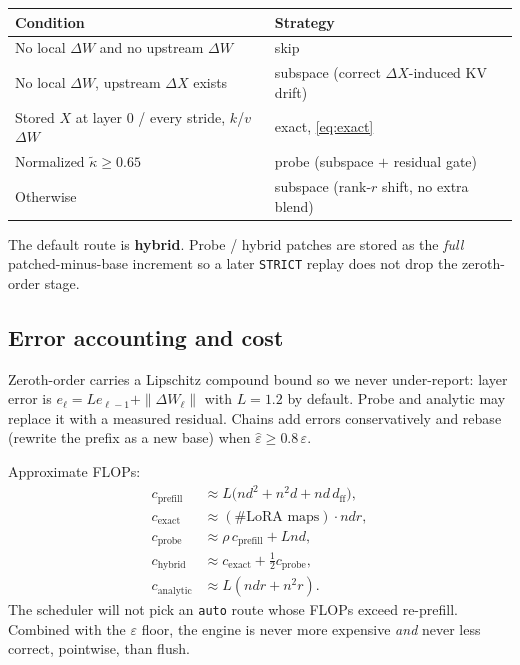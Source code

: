 \documentclass{article}
\begin{document}
\begin{center}
\small
\begin{tabular}{@{}ll@{}}
\toprule
Condition & Strategy \\
\midrule
No local $\Delta W$ and no upstream $\Delta W$ & skip \\
No local $\Delta W$, upstream $\Delta X$ exists & subspace (correct $\Delta X$-induced KV drift) \\
Stored $X$ at layer $0$ / every stride, $k$/$v$ $\Delta W$ & exact, \eqref{eq:exact} \\
Normalized $\tilde\kappa\ge 0.65$ & probe (subspace $+$ residual gate) \\
Otherwise & subspace (rank-$r$ shift, no extra blend) \\
\bottomrule
\end{tabular}
\end{center}

The default route is \textbf{hybrid}.
Probe / hybrid patches are stored as the \emph{full} patched-minus-base
increment so a later \texttt{STRICT} replay does not drop the zeroth-order
stage.

\subsection{Error accounting and cost}
\label{sec:cost}

Zeroth-order carries a Lipschitz compound bound so we never under-report:
layer error is $e_{\ell}=Le_{\ell-1}+\|\Delta W_\ell\|$ with $L=1.2$ by
default.
Probe and analytic may replace it with a measured residual.
Chains add errors conservatively and rebase (rewrite the prefix as a new
base) when $\hat\varepsilon\ge 0.8\,\varepsilon$.

Approximate FLOPs:
\begin{align}
  c_{\mathrm{prefill}} &\approx L\bigl(nd^2 + n^2 d + nd\,d_{\mathrm{ff}}\bigr),\\
  c_{\mathrm{exact}}   &\approx (\#\text{LoRA maps})\cdot ndr,\\
  c_{\mathrm{probe}}   &\approx \rho\, c_{\mathrm{prefill}} + Lnd,\\
  c_{\mathrm{hybrid}}  &\approx c_{\mathrm{exact}} + \tfrac12 c_{\mathrm{probe}},\\
  c_{\mathrm{analytic}}&\approx L(ndr + n^2 r).
\end{align}
The scheduler will not pick an \texttt{auto} route whose FLOPs exceed
re-prefill.
Combined with the $\varepsilon$ floor, the engine is never more expensive
\emph{and} never less correct, pointwise, than flush.
\end{document}
